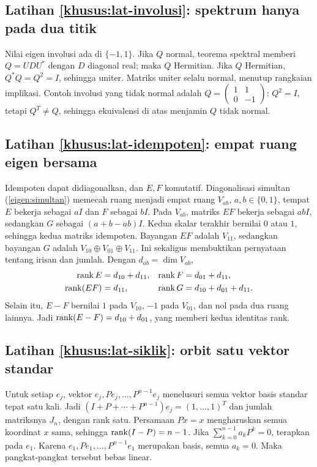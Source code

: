 \subsection*{Latihan \ref{khusus:lat-involusi}: spektrum hanya pada dua titik}
Nilai eigen involusi ada di $\{-1,1\}$.
Jika $Q$ normal, teorema spektral memberi $Q=UDU^*$ dengan
$D$ diagonal real; maka $Q$ Hermitian.
Jika $Q$ Hermitian, $Q^*Q=Q^2=I$, sehingga uniter.
Matriks uniter selalu normal, menutup rangkaian implikasi.
Contoh involusi yang tidak normal adalah
$Q=\begin{pmatrix}1&1\\0&-1\end{pmatrix}$:
$Q^2=I$, tetapi $Q^T\ne Q$, sehingga ekuivalensi di atas
menjamin $Q$ tidak normal.

\subsection*{Latihan \ref{khusus:lat-idempoten}: empat ruang eigen bersama}
Idempoten dapat didiagonalkan, dan $E,F$ komutatif.
Diagonalisasi simultan (\autoref{eigen:simultan}) memecah ruang
menjadi empat ruang $V_{ab}$, $a,b\in\{0,1\}$, tempat $E$
bekerja sebagai $aI$ dan $F$ sebagai $bI$.
Pada $V_{ab}$, matriks $EF$ bekerja sebagai $abI$,
sedangkan $G$ sebagai $(a+b-ab)I$.
Kedua skalar terakhir bernilai $0$ atau $1$, sehingga kedua
matriks idempoten. Bayangan $EF$ adalah $V_{11}$, sedangkan
bayangan $G$ adalah $V_{10}\oplus V_{01}\oplus V_{11}$.
Ini sekaligus membuktikan pernyataan tentang irisan dan jumlah.
Dengan $d_{ab}=\dim V_{ab}$,
\begin{align*}
    \operatorname{rank} E&=d_{10}+d_{11},&\operatorname{rank} F&=d_{01}+d_{11},\\
    \operatorname{rank}(EF)&=d_{11},&\operatorname{rank} G&=d_{10}+d_{01}+d_{11}.
\end{align*}
Selain itu, $E-F$ bernilai $1$ pada $V_{10}$, $-1$ pada
$V_{01}$, dan nol pada dua ruang lainnya.
Jadi $\operatorname{rank}(E-F)=d_{10}+d_{01}$, yang memberi kedua identitas rank.

\subsection*{Latihan \ref{khusus:lat-siklik}: orbit satu vektor standar}
Untuk setiap $e_j$, vektor $e_j,Pe_j,\ldots,P^{n-1}e_j$
menelusuri semua vektor basis standar tepat satu kali.
Jadi $(I+P+\cdots+P^{n-1})e_j=(1,\ldots,1)^T$ dan jumlah
matriksnya $J_n$, dengan rank satu.
Persamaan $Px=x$ mengharuskan semua koordinat $x$ sama,
sehingga $\operatorname{rank}(I-P)=n-1$.
Jika $\sum_{k=0}^{n-1}a_kP^k=0$, terapkan pada $e_1$.
Karena $e_1,Pe_1,\ldots,P^{n-1}e_1$ merupakan basis,
semua $a_k=0$. Maka pangkat-pangkat tersebut bebas linear.

